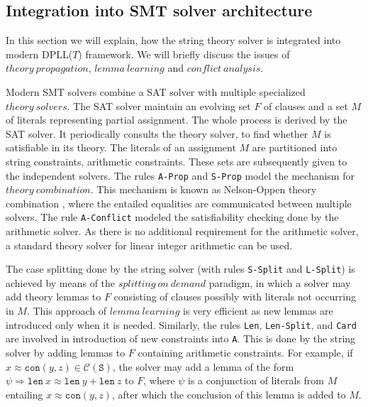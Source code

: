 \subsection{Integration  into SMT solver architecture}
\label{sec:Implementation in DPLLt}
In this section we will explain, how the string theory solver is integrated into modern DPLL($T$) framework.
We will briefly discuss the issues of $theory\ propagation$, $lemma\ learning$ and $conflict\ analysis$.

 
Modern SMT solvers combine a SAT solver with multiple specialized $theory\ solvers$. The SAT solver maintain an evolving set $F$ of clauses and a set $M$ of literals representing partial assignment. The whole process is derived by the SAT solver. It periodically consults the theory solver, to find whether $M$ is satisfiable in its theory. The literals of an assignment $M$ are partitioned into string constraints, arithmetic constraints. These sets are subsequently given to the independent solvers. The rules \texttt{A-Prop} and \texttt{S-Prop} model the mechanism for $theory\ combination$. This mechanism is known as Nelson-Oppen theory combination \cite{nelson_oppen}, where the entailed equalities are communicated between multiple solvers. The rule \texttt{A-Conflict} modeled the satisfiability checking done by the arithmetic solver. As there is no additional requirement for the arithmetic solver, a standard theory solver for linear integer arithmetic can be used. 

The case splitting done by the string solver (with rules \texttt{S-Split} and \texttt{L-Split}) is achieved by means of the $splitting\ on\ demand$ paradigm, in which a solver may add theory lemmas to $F$ consisting of clauses possibly with literals not occurring in $M$.  This approach of $lemma\ learning$ is very efficient as new lemmas are introduced only when it is needed.  Similarly, the rules \texttt{Len}, \texttt{Len-Split}, and \texttt{Card} are involved in introduction of new constraints into \texttt{A}. This is done by the string solver by adding lemmas to ${F}$ containing arithmetic constraints. For example, if $x \approx \texttt{con}(y, z) \in \mathcal{C}(\texttt{S})$, the solver may add a lemma of the form $ \psi \Rightarrow \texttt{len}\ x \approx \texttt{len}\ y + \texttt{len}\ z$ to $F$, where $\psi$ is a conjunction of literals from $M$ entailing $x \approx \texttt{con}(y, z)$, after which the conclusion of this lemma is added to $M$.

